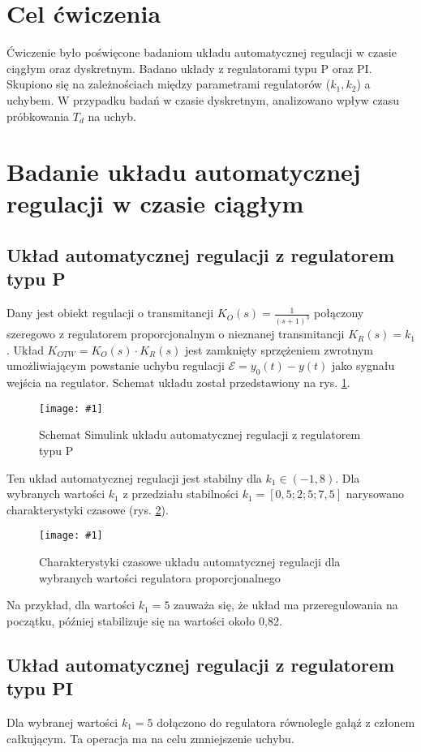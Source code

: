 \documentclass[12pt]{article}
\begin{document}
\newcommand{\zdjecie}[3]
{
    \begin{figure}[H]
        \renewcommand{\figurename}{Rys.}
        \centering
        \texttt{[image: \#1]}
        \caption{#2}
        \label{#3}
    \end{figure}
}


\tableofcontents
\newpage

\section{Cel ćwiczenia}
Ćwiczenie było poświęcone badaniom układu automatycznej regulacji w czasie ciągłym oraz dyskretnym. Badano układy z regulatorami typu P oraz PI. Skupiono się na zależnościach między parametrami regulatorów ($k_1, k_2$) a uchybem. W przypadku badań w czasie dyskretnym, analizowano wpływ czasu próbkowania $T_d$ na uchyb.
\section{Badanie układu automatycznej regulacji w czasie ciągłym}
\subsection{Układ automatycznej regulacji z regulatorem typu P}
Dany jest obiekt regulacji o transmitancji $K_O(s) = \frac{1}{(s+1)^3}$ połączony szeregowo z regulatorem proporcjonalnym o nieznanej transmitancji $K_R(s)=k_1$. Układ $K_{OTW} = K_O(s) \cdot K_R(s)$ jest zamknięty sprzężeniem zwrotnym umożliwiającym powstanie uchybu regulacji $ \mathcal{E} = y_0(t) - y(t)$ jako sygnału wejścia na regulator. Schemat układu został przedstawiony na rys. \ref{schemat_p}.

\zdjecie{sim_p.png}{Schemat Simulink układu automatycznej regulacji z regulatorem typu P}{schemat_p}

Ten układ automatycznej regulacji jest stabilny dla $k_1 \in (-1, 8) $. Dla wybranych wartości $k_1$ z przedziału stabilności $ k_1 = [0,5 ; 2 ; 5 ; 7,5] $ narysowano charakterystyki czasowe (rys. \ref{czasowe}).

\zdjecie{reg_p.png}{Charakterystyki czasowe układu automatycznej regulacji dla wybranych wartości regulatora proporcjonalnego}{czasowe}

Na przykład, dla wartości $k_1 = 5$ zauważa się, że układ ma przeregulowania na początku, później stabilizuje się na wartości około 0,82. 

\subsection{Układ automatycznej regulacji z regulatorem typu PI}
Dla wybranej wartości $k_1 = 5$ dołączono do regulatora równolegle gałąź z członem całkującym. Ta operacja ma na celu zmniejszenie uchybu.
\end{document}
